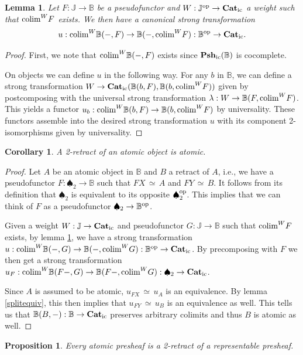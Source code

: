 \documentclass[12pt,oneside,reqno,a4paper]{article}
\newtheorem{corollary}[theorem]{Corollary}
\newtheorem{proposition}[theorem]{Proposition}
\newtheorem{lemma}[theorem]{Lemma}
\theoremstyle{definition}
\newcommand{\op}{^\textup{op}}
\newcommand{\Catic}{\textbf{\textup{Cat}}_\textup{ic}}
\newcommand{\Pshic}[1]{\textbf{\textup{Psh}}_\textup{ic}(#1)}
\newcommand{\spd}{\spadesuit}
\renewcommand{\equiv}{\,\simeq\,}
\newcommand{\bB}{\mathbb{B}}
\newcommand{\bJ}{\mathbb{J}}
\newcommand{\colim}{\textup{colim}}
\begin{document}
\begin{lemma} \label{univnat}
Let $F:\bJ\to\bB$ be a pseudofunctor and $W:\bJ\op\to\Catic$ a weight such that $\colim^W F$ exists. We then have a canonical strong transformation
\begin{align*}
u:\colim^W \bB(-,F) \to \bB(-,\colim^W F):\bB\op\to\Catic.
\end{align*}
\end{lemma}

\begin{proof}
First, we note that $\colim^W \bB(-,F)$ exists since $\Pshic{\bB}$ is cocomplete.
 
On objects we can define $u$ in the following way. For any $b$ in $\bB$, we can define a strong transformation $W\to\Catic(\bB(b,F),\bB(b,\colim^W F))$ given by postcomposing with the universal strong transformation $\lambda:W\to \bB(F,\colim^W F)$. This yields a functor $u_b: \colim^W \bB(b,F) \to \bB(b,\colim^W F)$ by universality. These functors assemble into the desired strong transformation $u$ with its component 2-isomorphisms given by universality.
\end{proof}

\begin{corollary} \label{x7}
A 2-retract of an atomic object is atomic.
\end{corollary}

\begin{proof}
Let $A$ be an atomic object in $\bB$ and $B$ a retract of $A$, i.e., we have a pseu\-do\-functor $F:\spd_2\to\bB$ such that $FX\equiv A$ and $FY \equiv B$. It follows from its definition that $\spd_2$ is equivalent to its opposite $\spd_2\op$. This implies that we can think of $F$ as a pseudofunctor $\spd_2\to\bB\op$.

Given a weight $W:\bJ\to\Catic$ and pseudofunctor $G:\bJ\to\bB$ such that $\colim^W F$ exists, by lemma \ref{univnat}, we have a strong transformation $u:\colim^W \bB(-,G) \to \bB(-,\colim^W G):\bB\op\to\Catic$. By precomposing with $F$ we then get a strong transformation $u_F:\colim^W \bB(F-,G) \to \bB(F-,\colim^W G):\spd_2\to\Catic$.

Since $A$ is assumed to be atomic, $u_{FX}\equiv u_A$ is an equivalence. By lemma \ref{splitequiv}, this then implies that $u_{FY}\equiv u_B$ is an equivalence as well. This tells us that $\bB(B,-):\bB\to\Catic$ preserves arbitrary colimits and thus $B$ is atomic as well.
\end{proof}

\begin{proposition} \label{2retato}
Every atomic presheaf is a 2-retract of a representable presheaf.
\end{proposition}
\end{document}
